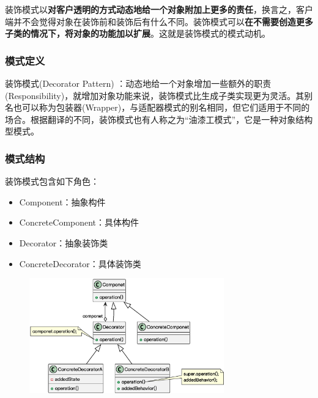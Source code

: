 装饰模式以\textbf{对客户透明的方式动态地给一个对象附加上更多的责任}，换言之，客户端并不会觉得对象在装饰前和装饰后有什么不同。装饰模式可以\textbf{在不需要创造更多子类的情况下，将对象的功能加以扩展}。这就是装饰模式的模式动机。

\subsubsection{模式定义}
装饰模式(Decorator Pattern) ：动态地给一个对象增加一些额外的职责(Responsibility)，就增加对象功能来说，装饰模式比生成子类实现更为灵活。其别名也可以称为包装器(Wrapper)，与适配器模式的别名相同，但它们适用于不同的场合。根据翻译的不同，装饰模式也有人称之为“油漆工模式”，它是一种对象结构型模式。

\subsubsection{模式结构}
装饰模式包含如下角色：
\vspace{-0.8em}
\begin{multicols}{2}
    \begin{itemize}
        \item Component：抽象构件
        \item ConcreteComponent：具体构件
        \item Decorator：抽象装饰类
        \item ConcreteDecorator：具体装饰类
    \end{itemize}
\end{multicols}
\vspace{-1em}

\begin{figure}[H]
    \vspace{-0.5em}
	\centering
	\includegraphics[width=0.75\textwidth]{images/装饰模式结构.eps}
    \vspace{-1em}
\end{figure}

